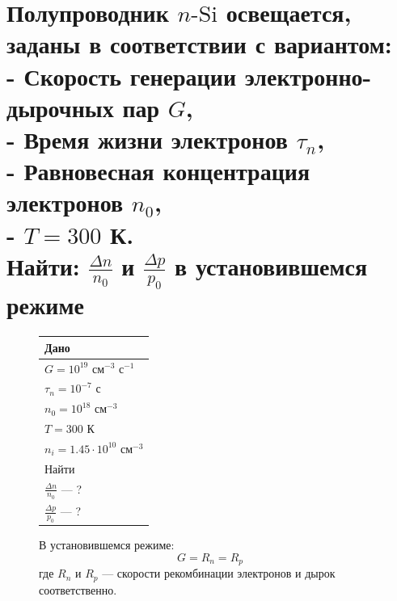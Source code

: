 \documentclass[12pt,a4paper]{article}
\theoremstyle{plain}
\theoremstyle{definition}
\theoremstyle{remark}
\numberwithin{equation}{section}
\begin{document}
\pagebreak

\section{\large\textnormal{Полупроводник $n\text{-Si}$ освещается, заданы в соответствии с вариантом:\\
- Скорость генерации электронно-дырочных пар $G$, \\
- Время жизни электронов $\tau_n$, \\
- Равновесная концентрация электронов $n_0$, \\
- $T = 300$ К. \\
Найти: $\frac{\Delta n}{n_0}$ и $\frac{\Delta p}{p_0}$ в установившемся режиме}}

\begin{figure}[H]
    \begin{minipage}[t]{0.3\textwidth}
        \vspace{0em}
        \begin{tabularx}{\textwidth}{|X|}
            \hline
            \multicolumn{1}{|C|}{Дано} \\
            \hline
            $G = 10^{19}$ см$^{-3}$ с$^{-1}$ \\
            $\tau_n = 10^{-7}$ с \\
            $n_0 = 10^{18}$ см$^{-3}$ \\
            $T = 300$ К \\
            $n_i = 1.45 \cdot 10^{10}$ см$^{-3}$ \\
            \hline
            \multicolumn{1}{|C|}{Найти} \\
            \hline
            $\frac{\Delta n}{n_0}$ — ? \\
            $\frac{\Delta p}{p_0}$ — ? \\
            \hline
        \end{tabularx}

        \vspace{0.5em}
        
        В установившемся режиме:
        \begin{equation*}
            G = R_n = R_p
        \end{equation*}
        где $R_n$ и $R_p$ — скорости рекомбинации электронов и дырок соответственно.


\end{minipage}
\end{figure}
\end{document}
